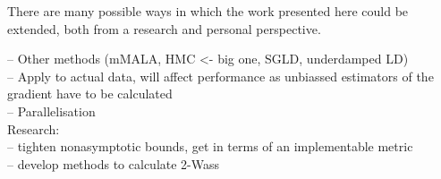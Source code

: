 There are many possible ways in which the work presented here could be extended, both from a research and personal perspective. 

-- Other methods (mMALA, HMC <- big one, SGLD, underdamped LD)\\
-- Apply to actual data, will affect performance as unbiassed estimators of the gradient have to be calculated\\
-- Parallelisation\\
Research: \\
-- tighten nonasymptotic bounds, get in terms of an implementable metric\\
-- develop methods to calculate 2-Wass\\